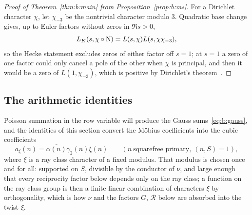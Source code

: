 \begin{proof}[Proof of Theorem~\ref{thm:b:main} from Proposition~\ref{prop:b:ms}]
For a Dirichlet character $\chi$, let $\chi_{-3}$ be the nontrivial character modulo $3$. Quadratic base change gives, up to Euler factors without zeros in $\Re s>0$,
\[
  L_K(s,\chi\circ\mathrm{N})=L(s,\chi)L(s,\chi\chi_{-3}),
\]
so the Hecke statement excludes zeros of either factor off $s=1$; at $s=1$ a zero of one factor could only cancel a pole of the other when $\chi$ is principal, and then it would be a zero of $L(1,\chi_{-3})$, which is positive by Dirichlet's theorem~\cite[Chapters~4 and~6]{Dav80}.
\end{proof}

\subsection{The arithmetic identities}\label{ssec:b:arithmetic}

Poisson summation in the row variable will produce the Gauss sums~\eqref{eq:b:gauss}, and the identities of this section convert the M\"obius coefficients into the cubic coefficients
\begin{equation}\label{eq:b:axi}
  a_\xi(n)=\overline{\alpha(n)}\gamma_2(n)\xi(n)\qquad(n\ \text{squarefree primary},\ (n,S)=1),
\end{equation}
where $\xi$ is a ray class character of a fixed modulus. That modulus is chosen once and for all: supported on $S$, divisible by the conductor of $\nu$, and large enough that every reciprocity factor below depends only on the ray class; a function on the ray class group is then a finite linear combination of characters $\xi$ by orthogonality, which is how $\nu$ and the factors $G$, $\mathcal R$ below are absorbed into the twist $\xi$.

